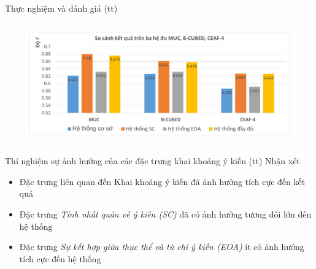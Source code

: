\documentclass[9pt,xcolor=table,hyperref=unicode]{beamer}
\begin{document}
		\begin{frame}[t]{Thực nghiệm và đánh giá (tt)}								
			\begin{columns}[t]
				\begin{column}{\textwidth}
					\begin{figure}[H] 			
						\centering					
						\includegraphics[scale=0.38]{charts/chart_comparison.pdf}									
					\end{figure} 				
				\end{column}
			\end{columns}
			\begin{columns}[t]
				\begin{column}{\textwidth}
					\begin{block}{Thí nghiệm sự ảnh hưởng của các đặc trưng khai khoáng ý kiến (tt)}
						\footnotesize
						Nhận xét		
						\begin{itemize}
							\item{Đặc trưng liên quan đến Khai khoáng ý kiến đã ảnh hưởng tích cực đến kết quả}
							\item{Đặc trưng \textit{Tính nhất quán về ý kiến (SC)} đã có ảnh hưởng tương đối lớn đến hệ thống}
							\item{Đặc trưng \textit{Sự kết hợp giữa thực thể và từ chỉ ý kiến (EOA)} ít có ảnh hưởng tích cực đến hệ thống}							
						\end{itemize}			
					\end{block}
				\end{column}				
			\end{columns}						
		\end{frame}					
\end{document}
